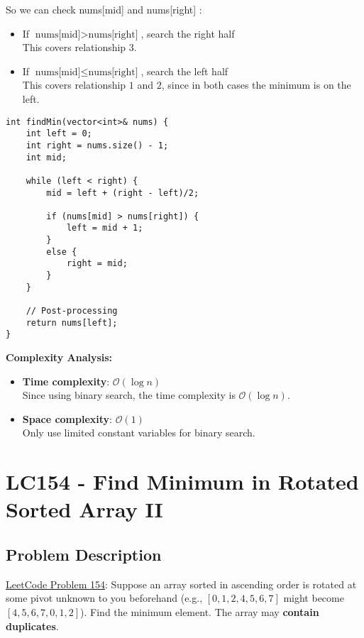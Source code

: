 \documentclass[justified]{tufte-book}
\begin{document}
So we can check nums[mid] and nums[right] : 
\begin{itemize}
    \item If $\text{nums[mid]} > \text{nums[right]}$, search the right half \\
    This covers relationship $3$.
    \item If $\text{nums[mid]} \leq \text{nums[right]}$, search the left half \\
    This covers relationship $1$ and $2$, since in both cases the minimum is on the left.
\end{itemize}

\begin{lstlisting}
int findMin(vector<int>& nums) {
    int left = 0; 
    int right = nums.size() - 1;
    int mid;
    
    while (left < right) {
        mid = left + (right - left)/2;
        
        if (nums[mid] > nums[right]) {
            left = mid + 1;
        }
        else {
            right = mid;
        }
    }
    
    // Post-processing
    return nums[left];
}
\end{lstlisting}
\noindent \textbf{Complexity Analysis:}
\begin{itemize}
    \item \textbf{Time complexity}: $\mathcal{O}(\log n)$ \\
    Since using binary search, the time complexity is $\mathcal{O}(\log n)$.
    \item \textbf{Space complexity}: $\mathcal{O}(1)$ \\
    Only use limited constant variables for binary search.
\end{itemize}

\section{LC154 - Find Minimum in Rotated Sorted Array II} \label{sec:lc154_find_min_rotated_sorted_array_ii}
\subsection{Problem Description}
\href{https://leetcode.com/problems/find-minimum-in-rotated-sorted-array-ii/}{LeetCode Problem 154}: Suppose an array sorted in ascending order is rotated at some pivot unknown to you beforehand (e.g.,  $[0,1,2,4,5,6,7]$ might become $[4,5,6,7,0,1,2]$). Find the minimum element. The array may \textbf{contain duplicates}. 
\end{document}
